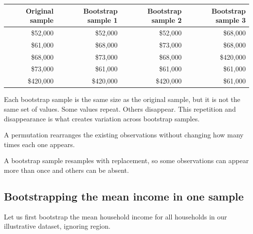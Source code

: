 \documentclass[
  letterpaper,
  DIV=11,
  numbers=noendperiod]{scrreprt}
\begin{document}
\begin{table}
\fontsize{12.0pt}{14.0pt}\selectfont
\begin{tabular*}{\linewidth}{@{\extracolsep{\fill}}rrrr}
\toprule
Original sample & Bootstrap sample 1 & Bootstrap sample 2 & Bootstrap sample 3 \\ 
\midrule\addlinespace[2.5pt]
\$52,000 & \$52,000 & \$52,000 & \$68,000 \\ 
\$61,000 & \$68,000 & \$73,000 & \$68,000 \\ 
\$68,000 & \$73,000 & \$68,000 & \$420,000 \\ 
\$73,000 & \$61,000 & \$61,000 & \$61,000 \\ 
\$420,000 & \$420,000 & \$420,000 & \$61,000 \\ 
\bottomrule
\end{tabular*}
\end{table}

Each bootstrap sample is the same size as the original sample, but it is
not the same set of values. Some values repeat. Others disappear. This
repetition and disappearance is what creates variation across bootstrap
samples.

\begin{tcolorbox}[enhanced jigsaw, arc=.35mm, bottomrule=.15mm, bottomtitle=1mm, breakable, colback=white, colbacktitle=quarto-callout-important-color!10!white, colframe=quarto-callout-important-color-frame, coltitle=black, left=2mm, leftrule=.75mm, opacityback=0, opacitybacktitle=0.6, rightrule=.15mm, title=\textcolor{quarto-callout-important-color}{\faExclamation}\hspace{0.5em}{Note: Bootstrap samples are not permutations}, titlerule=0mm, toprule=.15mm, toptitle=1mm]

A permutation rearranges the existing observations without changing how
many times each one appears.

A bootstrap sample resamples with replacement, so some observations can
appear more than once and others can be absent.

\end{tcolorbox}

\subsection{Bootstrapping the mean income in one
sample}\label{bootstrapping-the-mean-income-in-one-sample}

Let us first bootstrap the mean household income for all households in
our illustrative dataset, ignoring region.
\end{document}
